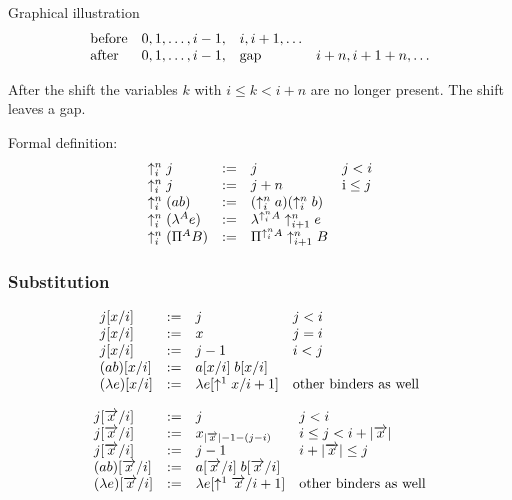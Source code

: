 \noindent Graphical illustration
$$
\begin{array}{lllll} 
    \text{before}
    &
    0, 1, \ldots, i - 1,
    &
    i, i + 1, \ldots
    \\
    \text{after}
    &
    0, 1, \ldots, i - 1,
    &
    \text{gap}
    &
    i + n, i + 1 + n, \ldots
 \end{array}
$$

After the shift the variables $k$ with $i \le k < i + n$ are no longer present.
The shift leaves a gap.


Formal definition:
$$
\begin{array}{lllll} 
    \uparrow^{n}_{i} j &:=& j &  j < i
    \\
    \uparrow^{n}_{i} j &:=& j + n & \text i \le j
    \\
    \uparrow^{n}_{i} (a b) &:=& (\uparrow^{n}_{i} a) (\uparrow^{n}_{i} b)
    \\
    \uparrow^{n}_{i} (\lambda^A e)
    &:=&
    \lambda^{\uparrow^{n}_{i} A} \uparrow^{n}_{i + 1} e
    \\
    \uparrow^{n}_{i} (\Pi^A B)
    &:=&
    \Pi^{\uparrow^{n}_{i} A} \uparrow^{n}_{i + 1} B
 \end{array}
$$




\subsubsection{Substitution}

$$
\begin{array}{lllll} 
    j [x/i]
    &:=&
    j               & j < i
    \\
    j[x / i]
    &:=&
    x               & j = i
    \\
    j [x / i] &:=& j - 1  & i < j
    \\
    (a b)[x /i] &:=&
    a[x / i] \; b[x / i]
    \\
    (\lambda e)[x / i]
    &:=&
    \lambda  e[\uparrow^{1} x / i + 1] & \text{other binders as well}
 \end{array}
$$



$$
\begin{array}{lllll} 
    j [ {\overrightarrow {x}} / i]
    &:=&
    j               & j < i
    \\
    j[{\overrightarrow {x}} / i]
    &:=&
    x_{|{\overrightarrow {x}}| - 1 - (j - i)}
    & i \le j < i + |{\overrightarrow {x}}|
    \\
    j [{\overrightarrow {x}} / i] &:=&
    j - 1  & i + |{\overrightarrow {x}}|  \le j
    \\
    (a b)[{\overrightarrow {x}} /i] &:=&
    a[{\overrightarrow {x}} / i] \; b[{\overrightarrow {x}} / i]
    \\
    (\lambda e)[{\overrightarrow {x}} / i]
    &:=&
    \lambda  e[\uparrow^{1} {\overrightarrow {x}} / i + 1] & \text{other binders as well}
 \end{array}
$$





